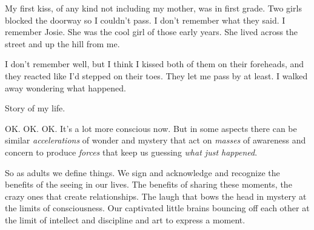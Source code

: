 

My first kiss, of any kind not including my mother, was in first
grade.  Two girls blocked the doorway so I couldn't pass.  I don't
remember what they said.  I remember Josie.  She was the cool girl of
those early years.  She lived across the street and up the hill from
me.

I don't remember well, but I think I kissed both of them on their
foreheads, and they reacted like I'd stepped on their toes.  They let
me pass by at least.  I walked away wondering what happened.

Story of my life.

OK. OK. OK.  It's a lot more conscious now.  But in some aspects there
can be similar {\it accelerations} of wonder and mystery that act on
{\it masses} of awareness and concern to produce {\it forces} that
keep us guessing {\it what just happened}.

So as adults we define things.  We sign and acknowledge and recognize
the benefits of the seeing in our lives.  The benefits of sharing
these moments, the crazy ones that create relationships.  The laugh
that bows the head in mystery at the limits of consciousness.  Our
captivated little brains bouncing off each other at the limit of
intellect and discipline and art to express a moment.

\bye
